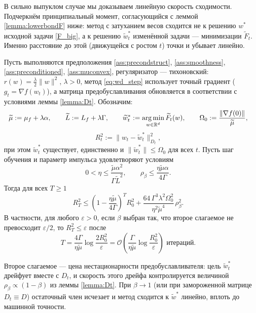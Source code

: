 В сильно выпуклом случае мы доказываем линейную скорость сходимости. Подчеркнём принципиальный момент, согласующийся с леммой \ref{lemma:lowerbondF} ниже: метод с затуханием весов сходится не к решению $w^*$ исходной задачи \eqref{F_big}, а к решению $\widetilde{w}^*_t$ изменённой задачи --- минимизации $\widetilde{F}_t$. Именно расстояние до этой (движущейся с ростом $t$) точки и убывает линейно.

\begin{theorem}
\label{theor:2}
    Пусть выполняются предположения \ref{ass:precondstruct}, \ref{ass:smoothness}, \ref{ass:preconditioned}, \ref{ass:muconvex}, регуляризатор --- тихоновский: $r(w) = \frac{\lambda}{2}\|w\|^2$, $\lambda > 0$, метод \eqref{eq:wd_step} использует точный градиент ($g_t = \nabla f(w_t)$), а матрица предобуславливания обновляется в соответствии с условиями леммы \ref{lemma:Dt}. Обозначим:
    $$\widetilde{\mu} := \mu_f + \lambda\alpha, \qquad \widetilde{L} := L_f + \lambda\Gamma, \qquad \widetilde{w}^*_t := \operatorname*{arg\,min}_{w \in \mathbb{R}^d} \widetilde{F}_t(w), \qquad \Omega_0 := \frac{\|\nabla f(0)\|}{\widetilde{\mu}},$$
    $$R_t^2 := \|w_t - \widetilde{w}^*_t\|^2_{D_t},$$
    при этом $\widetilde{w}^*_t$ существует, единственно и $\|\widetilde{w}^*_t\| \le \Omega_0$ для всех $t$.
    Пусть шаг обучения и параметр импульса удовлетворяют условиям
    \begin{equation*}
        0 < \eta \le \frac{\widetilde{\mu}\alpha^2}{\Gamma \widetilde{L}^2}, \qquad \rho_\beta \le \frac{\eta\widetilde{\mu}\alpha}{4\Gamma}.
    \end{equation*}
    Тогда для всех $T \ge 1$
    \begin{equation*}
        R_T^2 \le \left(1 - \frac{\eta\widetilde{\mu}}{4\Gamma}\right)^T R_0^2 + \frac{64\,\Gamma^3\lambda^2\Omega_0^2}{\eta^2\widetilde{\mu}^4}\,\rho_\beta^2.
    \end{equation*}
    В частности, для любого $\varepsilon > 0$, если $\beta$ выбран так, что второе слагаемое не превосходит $\varepsilon/2$, то $R_T^2 \le \varepsilon$ после
    \begin{equation*}
        T = \frac{4\Gamma}{\eta\widetilde{\mu}}\log\frac{2R_0^2}{\varepsilon} = \mathcal{O}\left(\frac{\Gamma}{\eta\widetilde{\mu}}\log\frac{R_0^2}{\varepsilon}\right) \text{ итераций.}
    \end{equation*}
\end{theorem}

\begin{note}
Второе слагаемое --- цена нестационарности предобуславливателя: цель $\widetilde{w}^*_t$ дрейфует вместе с $D_t$, и скорость этого дрейфа контролируется величиной $\rho_\beta \propto (1-\beta)$ из леммы \ref{lemma:Dt}. При $\beta \to 1$ (или при замороженной матрице $D_t \equiv D$) остаточный член исчезает и метод сходится к $\widetilde{w}^*$ линейно, вплоть до машинной точности.
\end{note}

